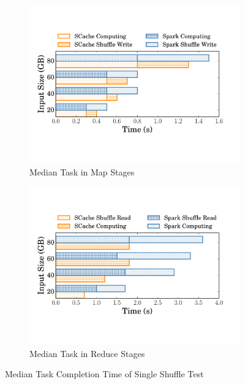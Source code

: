\begin{figure}
	\begin{minipage}[t]{.49\textwidth}
		\begin{subfigure}{.5\linewidth}
			\includegraphics[width=\linewidth]{fig/groupbymaptask}
			\caption{Median Task in Map Stages}
			\label{fig:maptask}
		\end{subfigure}
		\begin{subfigure}{.49\linewidth}
			\includegraphics[width=\linewidth]{fig/groupbyreducetask}
			\caption{Median Task in Reduce Stages}
			\label{fig:reducetask}
		\end{subfigure}
		\caption{Median Task Completion Time of Single Shuffle Test}
		\label{fig:singleshuffletask}
	\end{minipage}	
\end{figure}

